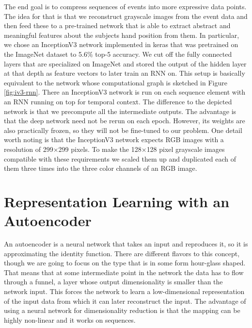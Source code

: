The end goal is to compress sequences of events into more expressive data
points. The idea for that is that we reconstruct grayscale images from the event
data and then feed these to a pre-trained network that is able to extract
abstract and meaningful features about the subjects hand position from them. In
particular, we chose an InceptionV3 network \cite{inceptionv3} implemented in
keras \cite{chollet2015keras} that was pretrained on the ImageNet dataset to
5.6\% top-5 accuracy. We cut off the fully connected layers that are specialized
on ImageNet and stored the output of the hidden layer at that depth as feature
vectors to later train an RNN on. This setup is basically equivalent to the
network whose computational graph is sketched in Figure \ref{fig:iv3-rnn}. There
an InceptionV3 network is run on each sequence element with an RNN running on
top for temporal context. The difference to the depicted network is that we
precompute all the intermediate outputs. The advantage is that the deep network
need not be rerun on each epoch. However, its weights are also practically
frozen, so they will not be fine-tuned to our problem. One detail worth noting
is that the InceptionV3 network expects RGB images with a resolution of
299$\times$299 pixels. To make the 128$\times$128 pixel grayscale images
compatible with these requirements we scaled them up and duplicated each of them
three times into the three color channels of an RGB image.

\section{Representation Learning with an Autoencoder}
\label{sec:autoencoder}

An autoencoder is a neural network that takes an input and reproduces it, so it
is approximating the identity function. There are different flavors to this
concept, though we are going to focus on the type that is in some form
hour-glass shaped. That means that at some intermediate point in the network the
data has to flow through a funnel, a layer whose output dimensionality is
smaller than the network input. This forces the network to learn a
low-dimensional representation of the input data from which it can later
reconstruct the input. The advantage of using a neural network for
dimensionality reduction is that the mapping can be highly non-linear and it
works on sequences.

